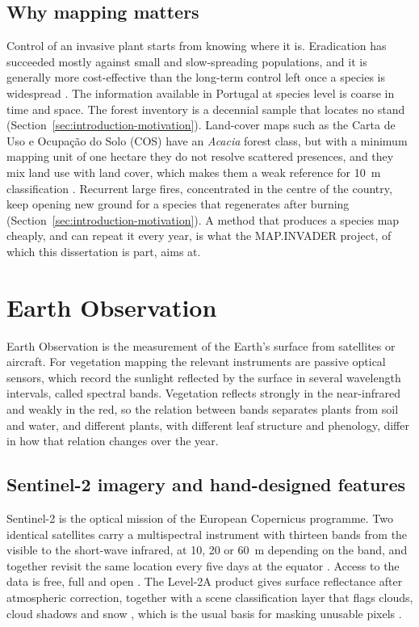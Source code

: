 \subsection{Why mapping matters}
\label{sec:background-iap-mapping}

Control of an invasive plant starts from knowing where it is.
Eradication has succeeded mostly against small and slow-spreading
populations, and it is generally more cost-effective than the long-term
control left once a species is widespread \cite{ipbes2023}. The
information available in Portugal at species level is coarse in time
and space. The forest inventory is a decennial sample that locates no
stand (Section~\ref{sec:introduction-motivation}). Land-cover maps
such as the Carta de Uso e Ocupação do Solo (COS) have an
\emph{Acacia} forest class, but with a minimum mapping unit of one
hectare they do not resolve scattered presences, and they mix land use
with land cover, which makes them a weak reference for 10~m
classification \cite{fonte2020}. Recurrent large fires, concentrated
in the centre of the country, keep opening new ground for a species
that regenerates after burning
(Section~\ref{sec:introduction-motivation}). A method that produces a
species map cheaply, and can repeat it every year, is what the
MAP.INVADER project, of which this dissertation is part, aims at.

\section{Earth Observation}
\label{sec:background-eo}

Earth Observation is the measurement of the Earth's surface from
satellites or aircraft. For vegetation mapping the relevant
instruments are passive optical sensors, which record the sunlight
reflected by the surface in several wavelength intervals, called
spectral bands. Vegetation reflects strongly in the near-infrared and
weakly in the red, so the relation between bands separates plants from
soil and water, and different plants, with different leaf structure
and phenology, differ in how that relation changes over the year.

\subsection{Sentinel-2 imagery and hand-designed features}
\label{sec:background-eo-sentinel2}

Sentinel-2 is the optical mission of the European Copernicus
programme. Two identical satellites carry a multispectral instrument
with thirteen bands from the visible to the short-wave infrared, at
10, 20 or 60~m depending on the band, and together revisit the same
location every five days at the equator \cite{esa-s2mission}. Access
to the data is free, full and open \cite{ec-sentinel-legal}. The
Level-2A product gives surface reflectance after atmospheric
correction, together with a scene classification layer that flags
clouds, cloud shadows and snow \cite{esa-s2processing}, which is the
usual basis for masking unusable pixels \cite{ball2026}.

